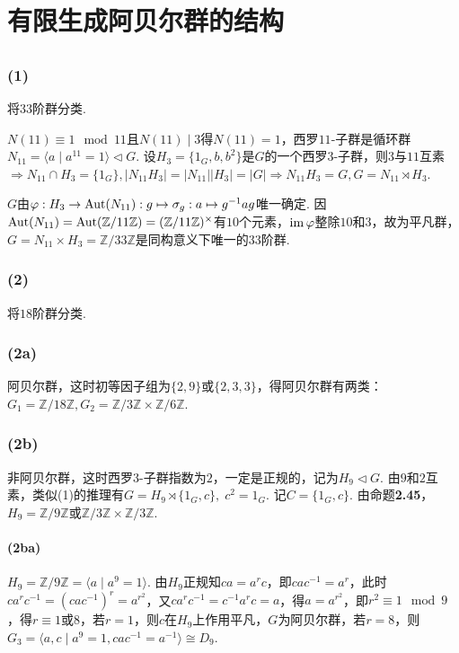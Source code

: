 \section{有限生成阿贝尔群的结构}
\subsection{}
\subsubsection{(1)}
将$33$阶群分类.

\jie
$N(11)\equiv 1\mod 11$且$N(11)\mid 3$得$N(11)=1$，西罗$11$-子群是循环群$N_{11}=\langle a\mid a^{11}=1\rangle\vartriangleleft G$.
设$H_3=\{1_G,b,b^2\}$是$G$的一个西罗$3$-子群，则$3$与$11$互素$\Rightarrow N_{11}\cap H_3=\{1_G\}, |N_{11}H_3|=|N_{11}||H_3|=|G|\Rightarrow N_{11}H_3=G, G=N_{11}\rtimes H_3$.

$G$由$\varphi: H_3\rightarrow \operatorname{Aut}(N_{11}): g\mapsto \sigma_g: a\mapsto g^{-1}ag$唯一确定.
因$\operatorname{Aut}(N_{11})=\operatorname{Aut}(\mathbb{Z}/11\mathbb{Z})=(\mathbb{Z}/11\mathbb{Z})^{\times}$有$10$个元素，$\operatorname{im}\varphi$整除$10$和$3$，故为平凡群，$G=N_{11}\times H_3=\mathbb{Z}/33\mathbb{Z}$是同构意义下唯一的$33$阶群.

\subsubsection{(2)}
将$18$阶群分类.

\jie
\subsubsection{(2a)}
阿贝尔群，这时初等因子组为$\{2,9\}$或$\{2,3,3\}$，得阿贝尔群有两类：
$G_1=\mathbb{Z}/18\mathbb{Z}, G_2=\mathbb{Z}/3\mathbb{Z}\times\mathbb{Z}/6\mathbb{Z}$.
\subsubsection{(2b)}
非阿贝尔群，这时西罗$3$-子群指数为$2$，一定是正规的，记为$H_9\vartriangleleft G$. 由$9$和$2$互素，类似(1)的推理有$G=H_9\rtimes \{1_G,c\},\;c^2=1_G$. 记$C=\{1_G,c\}$.
由{\heiti 命题}\textbf{2.45}，$H_9=\mathbb{Z}/9\mathbb{Z}$或$\mathbb{Z}/3\mathbb{Z}\times\mathbb{Z}/3\mathbb{Z}$.
\paragraph{(2ba)}
$H_9=\mathbb{Z}/9\mathbb{Z}=\langle a\mid a^9=1\rangle$. 
由$H_9$正规知$ca=a^rc$，即$cac^{-1}=a^r$，此时$ca^rc^{-1}=(cac^{-1})^r=a^{r^2}$，又$ca^rc^{-1}=c^{-1}a^rc=a$，得$a=a^{r^2}$，即$r^2\equiv 1\mod 9$，得$r\equiv 1$或$8$，若$r=1$，则$c$在$H_9$上作用平凡，$G$为阿贝尔群，若$r=8$，则$G_3=
\langle a,c\mid a^9=1, cac^{-1}=a^{-1}\rangle \cong D_9$.

